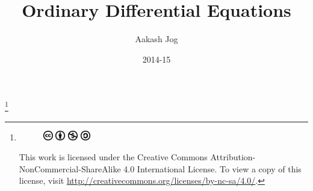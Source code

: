 \documentclass[fleqn, a4paper, 8pt, twoside]{amsart}
\title{Ordinary Differential Equations}
\author{Aakash Jog}
\date{2014-15}
\theoremstyle{definition}
\theoremstyle{theorem}
\newcommand\blfootnote[1]{%
	\begingroup
	\renewcommand\thefootnote{}\footnote{#1}%
	\addtocounter{footnote}{-1}%
	\endgroup
}
\begin{document}
\maketitle

\blfootnote
{	
	\begin{figure}[H]
		\includegraphics[height = 12pt]{cc.eps}
		\includegraphics[height = 12pt]{by.eps}
		\includegraphics[height = 12pt]{nc.eps}
		\includegraphics[height = 12pt]{sa.eps}
	\end{figure}
	This work is licensed under the Creative Commons Attribution-NonCommercial-ShareAlike 4.0 International License. To view a copy of this license, visit \url{http://creativecommons.org/licenses/by-nc-sa/4.0/}.
} %
\end{document}
